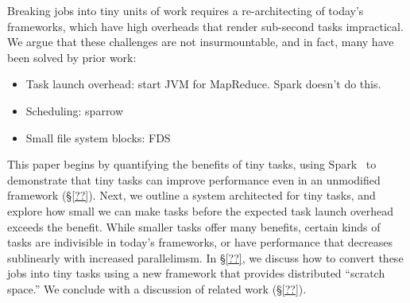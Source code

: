 Breaking jobs into tiny units of work requires a re-architecting of today's frameworks, which have high overheads that render sub-second tasks impractical.
We argue that these challenges are not insurmountable, and in fact, many
have been solved by prior work:
\begin{itemize}
\item Task launch overhead: start JVM for MapReduce. Spark doesn't do this.
\item Scheduling: sparrow
\item Small file system blocks: FDS
\end{itemize}

This paper begins by quantifying the benefits of tiny tasks,
using Spark~\cite{??} to demonstrate that tiny tasks can improve performance
even in an unmodified framework (\S\ref{??}).
Next, we outline a system architected for tiny tasks, and explore how small
we can make tasks before the expected task launch overhead exceeds the benefit.
While smaller tasks offer many benefits, certain kinds of tasks are indivisible
in today's frameworks, or have performance that decreases sublinearly with
increased parallelimsm. In \S\ref{??}, we discuss how to convert these jobs
into tiny tasks using a new framework that provides distributed ``scratch
space.''
We conclude with a discussion of related work (\S\ref{??}).

\begin{comment}
Today's datacenters run increasingly diverse workloads. A decade ago, compute
clusters were designed for batch workloads: a typical job took hours to complete.
As users migrated large amounts of data to these clusters, they demanded ever
faster access to this data, spurring low-latency frameworks (e.g., Dremel, Spark,
Shark, Impala) that stripe work across thousands of machines or store data in
memory in order to complete jobs in seconds. While data analysts and user-facing
services rely on these low-latency frameworks, clusters continue to run
long-running, batch jobs (e.g., indexing the web), leading to a diverse mix of
job runtimes.  Workload studies from Facebook, Microsoft, Yahoo!, and Google
corroborate this claim, finding that job completion times range from seconds to days.
\end{comment}
